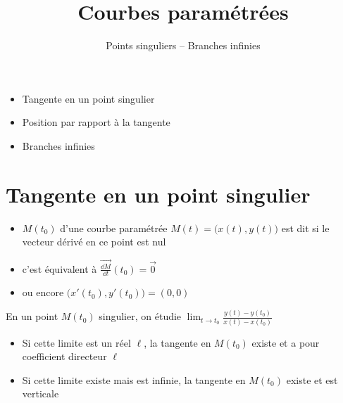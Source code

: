

  





\title{{\bf Courbes paramétrées}}
\subtitle{Points singuliers -- Branches infinies}

\begin{frame}
  
  \debutmontitre

  \pause

{\footnotesize
\hfill
{}
\begin{minipage}{0.6\textwidth}
  \begin{itemize}
    \item<3-> Tangente en un point singulier
    \item<4-> Position par rapport à la tangente
    \item<5-> Branches infinies   
  \end{itemize}
\end{minipage}
}

\end{frame}

\setcounter{framenumber}{0}



\section{Tangente en un point singulier}

\begin{frame}


\begin{itemize}
  \item $M(t_0)$ d'une courbe paramétrée $M(t) = \big( x(t),y(t)\big)$
est dit  si le vecteur dérivé en ce point est nul
\pause  
  \item c'est équivalent à $\overrightarrow{\frac{\dd M}{\dd t}}(t_0)=\vec{0}$
\pause   
  \item ou encore $\big( x'(t_0), y'(t_0)\big) = (0,0)$
\end{itemize}

\pause 
\mybox
{
\begin{minipage}{0.8\textwidth}
\begin{center}
En un point $M(t_0)$ singulier, on étudie 
$\displaystyle \lim_{t\rightarrow t_0}\frac{y(t)-y(t_0)}{x(t)-x(t_0)}$
\pause 
\begin{itemize}
  \item Si cette limite est un réel $\ell$, la tangente en $M(t_0)$ 
existe et a pour coefficient directeur $\ell$
\pause   
  \item Si cette limite existe mais est infinie, la tangente en $M(t_0)$ 
existe et est verticale
\pause 
\end{itemize}
\end{center}  
\end{minipage}
}
\end{frame}


